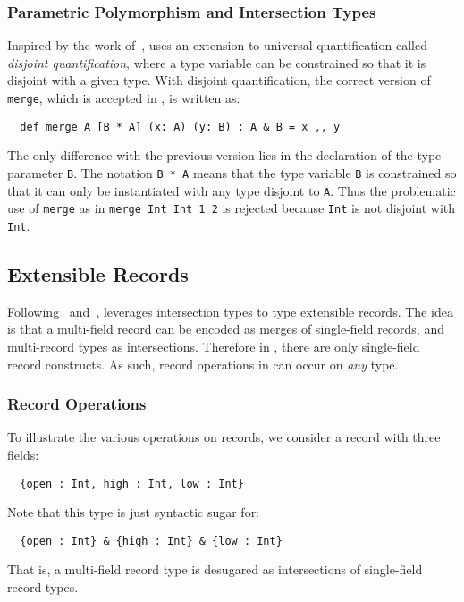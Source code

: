 \subsubsection{Parametric Polymorphism and Intersection Types}
\label{sec:polymorphism}

Inspired by the work of~\citet{alpuimdisjoint}, \name uses an extension to
universal quantification called \textit{disjoint quantification}, where a type
variable can be constrained so that it is disjoint with a given type. With
disjoint quantification, the correct version of \lstinline{merge}, which is
accepted in \name, is written as:
\begin{lstlisting}
  def merge A [B * A] (x: A) (y: B) : A & B = x ,, y
\end{lstlisting}

The only difference with the previous version lies in the declaration of the
type parameter \lstinline{B}. The notation \lstinline{B * A} means that the type
variable \lstinline{B} is constrained so that it can only be instantiated with
any type disjoint to \lstinline{A}. Thus the problematic use of
\lstinline{merge} as in \lstinline$merge Int Int 1 2$ is rejected because
\lstinline{Int} is not disjoint with \lstinline{Int}.


\subsection{Extensible Records}
\label{sec:records}

Following~\citet{reynolds1997design} and~\citet{castagna1995calculus}, \name
leverages intersection types to type extensible records. The idea is that a
multi-field record can be encoded as merges of single-field records, and
multi-record types as intersections. Therefore in \name, there are only
single-field record constructs. As such, record operations in \name can occur on
\textit{any} type.

\subsubsection{Record Operations}

To illustrate the various operations on records, we consider a record with three
fields:
\begin{lstlisting}
  {open : Int, high : Int, low : Int}
\end{lstlisting}
Note that this type is just syntactic sugar for:
\begin{lstlisting}
  {open : Int} & {high : Int} & {low : Int}
\end{lstlisting}
That is, a multi-field record type is desugared as intersections of single-field
record types.

